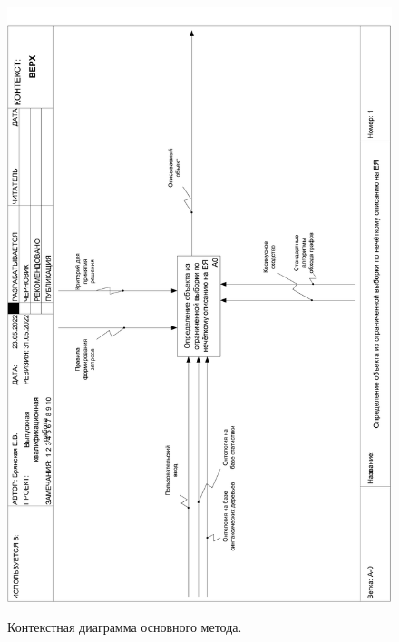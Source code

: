 \begin{figure}[h]
	\begin{center}
		{\includegraphics[scale = 0.39, angle=-90, page=1]{img/idef0/pdf/general.pdf}}
		\caption{Контекстная диаграмма основного метода.}
		\label{fig20:image}
	\end{center}
\end{figure}

